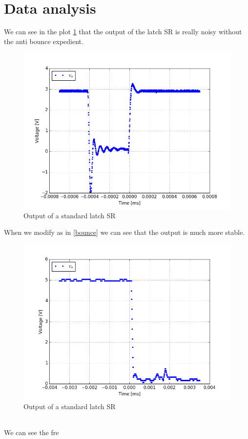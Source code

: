 \section{Data analysis}
We can see in the plot \ref{bounce_time} that the output of the latch SR is really noisy without the anti bounce expedient.
\begin{figure}[H]
\centering
\includegraphics[width=.7\textwidth]{11/bounce_time.png}
\caption{Output of a standard latch SR}\label{bounce_time}
\end{figure}
When we modify as in \ref{bounce} we can see that the output is much more stable.
\begin{figure}[H]
\centering
\includegraphics[width=.7\textwidth]{11/anti_bounce_time3.png}
\caption{Output of a standard latch SR}\label{anti_bounce_time3}
\end{figure}\\
We can see the fre
